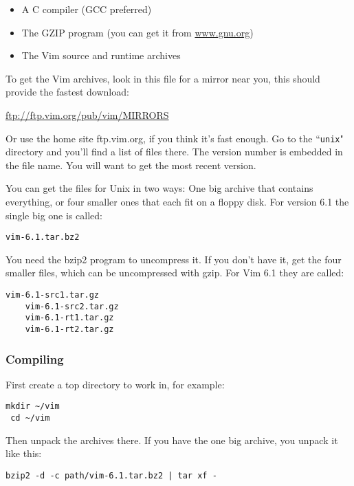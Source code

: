 \begin{itemize}
    \item A C compiler (GCC preferred)
    \item The GZIP program (you can get it from \url{www.gnu.org})
    \item The Vim source and runtime archives
\end{itemize}

To get the Vim archives, look in this file for a mirror near you, this should provide the fastest download:

    \url{ftp://ftp.vim.org/pub/vim/MIRRORS}

Or use the home site ftp.vim.org, if you think it's fast enough.
Go to the ``\texttt{unix}" directory and you'll find a list of files there.
The version number is embedded in the file name.
You will want to get the most recent version.

You can get the files for Unix in two ways: One big archive that contains everything, or four smaller ones that each fit on a floppy disk.
For version 6.1 the single big one is called:

\begin{Verbatim}[samepage=true]
    vim-6.1.tar.bz2
\end{Verbatim}

You need the bzip2 program to uncompress it.
If you don't have it, get the four smaller files, which can be uncompressed with gzip.
For Vim 6.1 they are called:

\begin{Verbatim}[samepage=true]
    vim-6.1-src1.tar.gz
    vim-6.1-src2.tar.gz
    vim-6.1-rt1.tar.gz
    vim-6.1-rt2.tar.gz
\end{Verbatim}

\subsubsection{Compiling}
First create a top directory to work in, for example:

\begin{Verbatim}[samepage=true]
 mkdir ~/vim
 cd ~/vim
\end{Verbatim}

Then unpack the archives there.
If you have the one big archive, you unpack it like this:

\begin{Verbatim}[samepage=true]
 bzip2 -d -c path/vim-6.1.tar.bz2 | tar xf -
\end{Verbatim}

